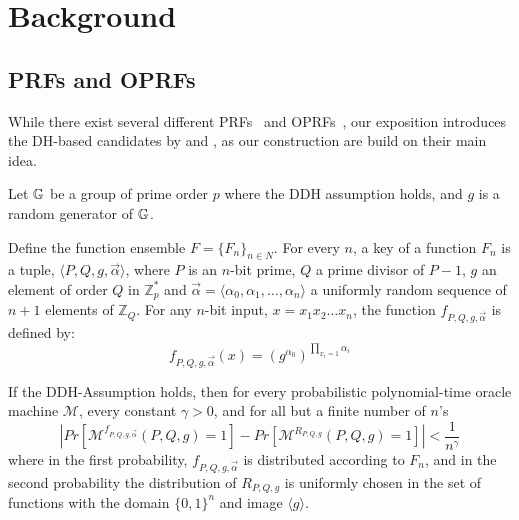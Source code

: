 \section{Background}
\subsection{PRFs and OPRFs}
While there exist several different PRFs~\cite{chaum,prf,dodis} and
OPRFs~\cite{oprf,stan,chase,koles,boneh,kia}, our exposition
introduces the DH-based candidates by \citet{prf} and \citet{oprf}, as
our construction are build on their main idea.

Let $\mathbb{G}$ be a group of prime order $p$ where the DDH assumption holds,
and $g$ is a random generator of $\mathbb{G}$.


\begin{construction} \label{nrprf}
Define the function ensemble $F = \{F_n\}_{n\in N}$.  For every $n$, a key of a function $F_n$ is a tuple, $\langle P,Q,g,\vec{\alpha}\rangle$, 
where $P$ is an $n$-bit prime, $Q$ a prime divisor of $P-1$, $g$ an element of order $Q$ in $\mathbb{Z}_{p}^*$ and $\vec{\alpha}=\langle 
\alpha_0,\alpha_1, \ldots , \alpha_n \rangle$ a uniformly random sequence of $n+1$ elements of $\mathbb{Z}_Q$.  For any $n$-bit input, $x=x_1 x_2 \ldots x_n$, the 
function $f_{P,Q,g,\vec{\alpha}}$ is defined by:
 $$f_{P,Q,g,\vec{\alpha}}(x) = (g^{\alpha_0})^{\prod_{x_i=1}\alpha_i}$$
\end{construction}

\begin{theorem}
\label{theorem:naor}
If the DDH-Assumption holds, then for every probabilistic polynomial-time oracle machine $\mathcal{M}$, every constant $\gamma > 0$, and for all but a finite number of $n$'s
$$| Pr[\mathcal{M}^{f_{P,Q,g,\vec{\alpha}}}(P,Q,g)=1] - Pr[\mathcal{M}^{R_{P,Q,g}}(P,Q,g) = 1]| < \frac{1}{n^\gamma} $$
where in the first probability, $f_{P,Q,g,\vec{\alpha}}$ is distributed according to $F_n$, and in the second probability the distribution of $R_{P,Q,g}$ is uniformly chosen in the set of functions with the domain $\{0,1\}^n$ and image $\langle g\rangle$.
\end{theorem}


